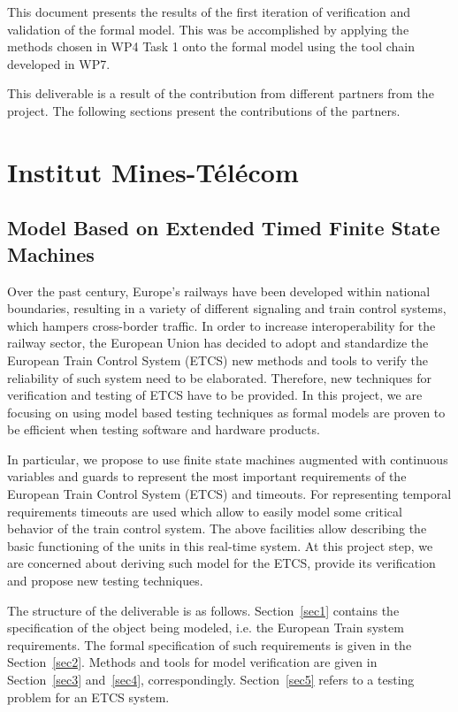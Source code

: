 \documentclass{template/openetcs_article}
\begin{document}
This document presents the results of the first iteration of verification and validation of the formal model. This was be accomplished
by applying the methods chosen in WP4 Task 1 onto the formal model using the tool
chain developed in WP7. 

This deliverable is a result of the contribution from different partners from the project. The following sections present the contributions of the partners.

\section{Institut Mines-Télécom}

\subsection{Model Based on Extended Timed Finite State Machines}

Over the past century, Europe's railways have been developed within national boundaries, resulting in a variety of different signaling and train control systems, which hampers cross-border traffic. In order to increase interoperability for the railway sector, the European Union has decided to adopt and standardize the European Train Control System (ETCS) new methods and tools to verify the reliability of such system need to be elaborated. Therefore, new techniques for verification and testing of ETCS have to be provided. In this project, we are focusing on using model based testing techniques as formal models are proven to be efficient when testing software and hardware products.
  
In particular, we propose to use finite state machines augmented with continuous variables and guards to represent the most important requirements of the European Train Control System (ETCS) and timeouts. For representing temporal requirements timeouts are used which allow to easily model some critical behavior of the train control system. The above facilities allow describing the basic functioning of the units in this real-time system. At this project step, we are concerned about deriving such model for the ETCS, provide its verification and propose new testing techniques.

The structure of the deliverable is as follows. Section~\ref{sec1} contains the specification of the object being modeled, i.e. the European Train system requirements. The formal specification of such requirements is given in the Section~\ref{sec2}. Methods and tools for model verification are given in Section~\ref{sec3} and~\ref{sec4}, correspondingly. Section~\ref{sec5} refers to a testing problem for an ETCS system.  
\end{document}
